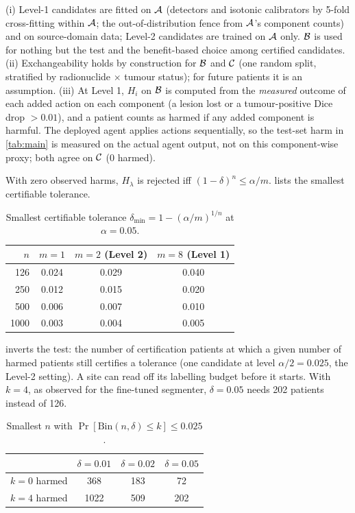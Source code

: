 (i) Level-1 candidates are fitted on $\mathcal{A}$ (detectors and isotonic calibrators by 5-fold cross-fitting within $\mathcal{A}$; the out-of-distribution fence from $\mathcal{A}$'s component counts) and on source-domain data; Level-2 candidates are trained on $\mathcal{A}$ only. $\mathcal{B}$ is used for nothing but the test and the benefit-based choice among certified candidates.
(ii) Exchangeability holds by construction for $\mathcal{B}$ and $\mathcal{C}$ (one random split, stratified by radionuclide $\times$ tumour status); for future patients it is an assumption.
(iii) At Level 1, $H_i$ on $\mathcal{B}$ is computed from the \emph{measured} outcome of each added action on each component (a lesion lost or a tumour-positive Dice drop $>0.01$), and a patient counts as harmed if any added component is harmful. The deployed agent applies actions sequentially, so the test-set harm in \cref{tab:main} is measured on the actual agent output, not on this component-wise proxy; both agree on $\mathcal{C}$ (0 harmed).

 With zero observed harms, $H_\lambda$ is rejected iff $(1-\delta)^n\le\alpha/m$.
 lists the smallest certifiable tolerance.

\begin{table}[h]
\centering
\caption{Smallest certifiable tolerance $\delta_{\min}=1-(\alpha/m)^{1/n}$ at $\alpha=0.05$.}
\label{tab:supp_power}
\small
\begin{tabular}{@{}rccc@{}}
\toprule
$n$ & $m=1$ & $m=2$ (Level 2) & $m=8$ (Level 1) \\
\midrule
126 & 0.024 & 0.029 & 0.040 \\
250 & 0.012 & 0.015 & 0.020 \\
500 & 0.006 & 0.007 & 0.010 \\
1000 & 0.003 & 0.004 & 0.005 \\
\bottomrule
\end{tabular}
\end{table}

  inverts the test: the number of certification patients at which a given number of harmed patients still certifies a tolerance (one candidate at level $\alpha/2=0.025$, the Level-2 setting). A site can read off its labelling budget before it starts. With $k=4$, as observed for the fine-tuned segmenter, $\delta=0.05$ needs 202 patients instead of 126.

\begin{table}[h]
\centering
\caption{Smallest $n$ with $\Pr[\mathrm{Bin}(n,\delta)\le k]\le0.025$.}
\label{tab:supp_n}
\small
\begin{tabular}{@{}rccc@{}}
\toprule
& $\delta=0.01$ & $\delta=0.02$ & $\delta=0.05$ \\
\midrule
$k=0$ harmed & 368 & 183 & 72 \\
$k=4$ harmed & 1022 & 509 & 202 \\
\bottomrule
\end{tabular}
\end{table}

